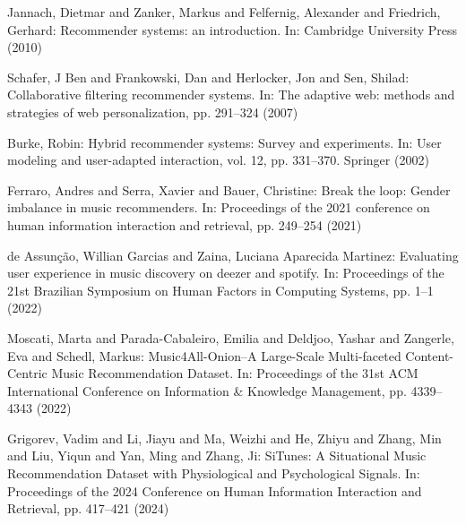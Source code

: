 \documentclass[runningheads,a4paper]{llncs}
\begin{document}
\begin{thebibliography}{4}
 Jannach, Dietmar and Zanker, Markus and Felfernig, Alexander and Friedrich, Gerhard: 
Recommender systems: an introduction. In: Cambridge University Press (2010)

 Schafer, J Ben and Frankowski, Dan and Herlocker, Jon and Sen, Shilad:
Collaborative filtering recommender systems. In: The adaptive web: methods and strategies of web personalization,
pp. 291--324 (2007)

 Burke, Robin: Hybrid recommender systems: Survey and experiments. In:
User modeling and user-adapted interaction, vol. 12, pp. 331--370. Springer (2002)

 Ferraro, Andres and Serra, Xavier and Bauer, Christine:
Break the loop: Gender imbalance in music recommenders. In:
Proceedings of the 2021 conference on human information interaction and retrieval,
pp. 249--254 (2021)

 de Assun{\c{c}}{\~a}o, Willian Garcias and Zaina, Luciana Aparecida Martinez:
Evaluating user experience in music discovery on deezer and spotify. In:
Proceedings of the 21st Brazilian Symposium on Human Factors in Computing Systems, pp. 1--1 (2022)

 Moscati, Marta and Parada-Cabaleiro, Emilia and Deldjoo, Yashar and Zangerle, Eva and Schedl, Markus:
Music4All-Onion--A Large-Scale Multi-faceted Content-Centric Music Recommendation Dataset. In:
Proceedings of the 31st ACM International Conference on Information \& Knowledge Management, pp. 4339--4343 (2022)

 Grigorev, Vadim and Li, Jiayu and Ma, Weizhi and He, Zhiyu and Zhang, Min and Liu, Yiqun and Yan, Ming and Zhang, Ji:
SiTunes: A Situational Music Recommendation Dataset with Physiological and Psychological Signals. In: Proceedings of the 2024 Conference on Human Information Interaction and Retrieval,
pp. 417--421 (2024)




\end{thebibliography}
\end{document}

